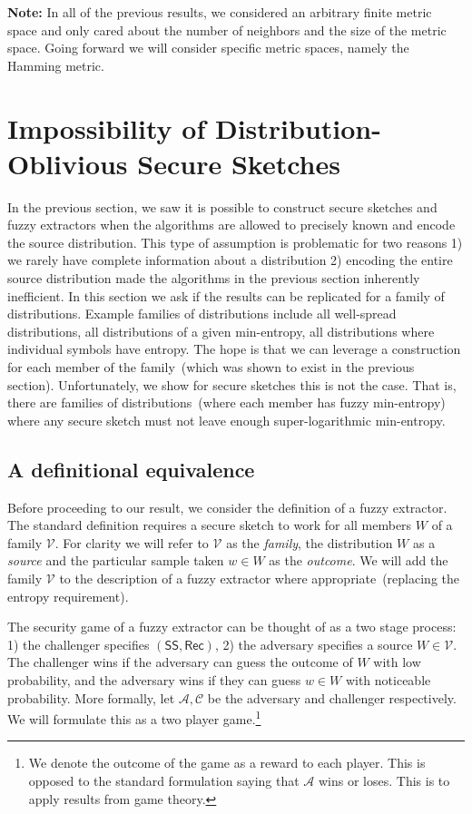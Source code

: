 \documentclass[11pt]{article}
\newcommand{\class}[1]{{\ensuremath{\mathsf{#1}}}}
\newcommand{\sketch}{\ensuremath{\class{SS}}\xspace}
\newcommand{\rec}{\ensuremath{\class{Rec}}\xspace}
\begin{document}
\textbf{Note:} In all of the previous results, we considered an arbitrary finite metric space and only cared about the number of neighbors and the size of the metric space.  Going forward we will consider specific metric spaces, namely the Hamming metric.
\section{Impossibility of Distribution-Oblivious Secure Sketches}
\label{sec:dist oblivious}

In the previous section, we saw it is possible to construct secure sketches and fuzzy extractors when the algorithms are allowed to precisely known and encode the source distribution.  This type of assumption is problematic for two reasons 1) we rarely have complete information about a distribution 2) encoding the entire source distribution made the algorithms in the previous section inherently inefficient.  In this section we ask if the results can be replicated for a family of distributions.  Example families of distributions include all well-spread distributions, all distributions of a given min-entropy, all distributions where individual symbols have entropy.  The hope is that we can leverage a construction for each member of the family~(which was shown to exist in the previous section).  Unfortunately, we show for secure sketches this is not the case.  That is, there are families of distributions~(where each member has fuzzy min-entropy) where any secure sketch must not leave enough super-logarithmic min-entropy.

\subsection{A definitional equivalence}
Before proceeding to our result, we consider the definition of a fuzzy extractor.  The standard definition requires a secure sketch to work for all members $W$ of a family $\mathcal{V}$.  For clarity we will refer to $\mathcal{V}$ as the \emph{family}, the distribution $W$ as a \emph{source} and the particular sample taken $w\in W$ as the \emph{outcome}.    We will add the family $\mathcal{V}$ to the description of a fuzzy extractor where appropriate~(replacing the entropy requirement).

The security game of a fuzzy extractor can be thought of as a two stage process: 1) the challenger specifies $(\sketch, \rec)$, 2) the adversary specifies a source $W\in \mathcal{V}$.  The challenger wins if the adversary can guess the outcome of $W$ with low probability, and the adversary wins if they can guess $w\in W$ with noticeable probability.  More formally, let $\mathcal{A}, \mathcal{C}$ be the adversary and challenger respectively. We will formulate this as a two player game.\footnote{We denote the outcome of the game as a reward to each player.  This is opposed to the standard formulation saying that $\mathcal{A}$ wins or loses.  This is to apply results from game theory.}
\end{document}
